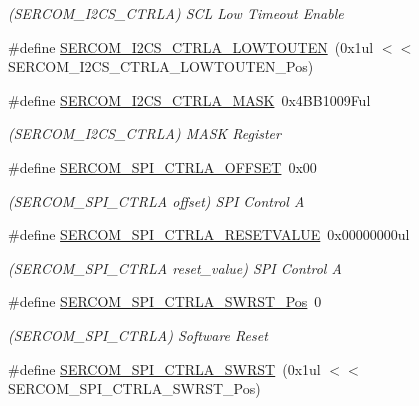 \begin{DoxyCompactItemize}
\begin{DoxyCompactList}\small\item\em (S\+E\+R\+C\+O\+M\+\_\+\+I2\+C\+S\+\_\+\+C\+T\+R\+LA) S\+CL Low Timeout Enable \end{DoxyCompactList}\item 
\#define \mbox{\hyperlink{group___s_a_m_d21___s_e_r_c_o_m_ga2530ee9d6d9364c37db47f66cf0dc193}{S\+E\+R\+C\+O\+M\+\_\+\+I2\+C\+S\+\_\+\+C\+T\+R\+L\+A\+\_\+\+L\+O\+W\+T\+O\+U\+T\+EN}}~(0x1ul $<$$<$ S\+E\+R\+C\+O\+M\+\_\+\+I2\+C\+S\+\_\+\+C\+T\+R\+L\+A\+\_\+\+L\+O\+W\+T\+O\+U\+T\+E\+N\+\_\+\+Pos)
\item 
\#define \mbox{\hyperlink{group___s_a_m_d21___s_e_r_c_o_m_gab8ffa0fe78ed6da3f431811f007f3504}{S\+E\+R\+C\+O\+M\+\_\+\+I2\+C\+S\+\_\+\+C\+T\+R\+L\+A\+\_\+\+M\+A\+SK}}~0x4\+B\+B1009\+Ful
\begin{DoxyCompactList}\small\item\em (S\+E\+R\+C\+O\+M\+\_\+\+I2\+C\+S\+\_\+\+C\+T\+R\+LA) M\+A\+SK Register \end{DoxyCompactList}\item 
\#define \mbox{\hyperlink{group___s_a_m_d21___s_e_r_c_o_m_ga72986752fedd413e6f842101677e7f52}{S\+E\+R\+C\+O\+M\+\_\+\+S\+P\+I\+\_\+\+C\+T\+R\+L\+A\+\_\+\+O\+F\+F\+S\+ET}}~0x00
\begin{DoxyCompactList}\small\item\em (S\+E\+R\+C\+O\+M\+\_\+\+S\+P\+I\+\_\+\+C\+T\+R\+LA offset) S\+PI Control A \end{DoxyCompactList}\item 
\#define \mbox{\hyperlink{group___s_a_m_d21___s_e_r_c_o_m_ga052a5b91f3d8c03c1814502c051d4c3f}{S\+E\+R\+C\+O\+M\+\_\+\+S\+P\+I\+\_\+\+C\+T\+R\+L\+A\+\_\+\+R\+E\+S\+E\+T\+V\+A\+L\+UE}}~0x00000000ul
\begin{DoxyCompactList}\small\item\em (S\+E\+R\+C\+O\+M\+\_\+\+S\+P\+I\+\_\+\+C\+T\+R\+LA reset\+\_\+value) S\+PI Control A \end{DoxyCompactList}\item 
\#define \mbox{\hyperlink{group___s_a_m_d21___s_e_r_c_o_m_ga2f3b0e958c4be7c848b3934c5648de5b}{S\+E\+R\+C\+O\+M\+\_\+\+S\+P\+I\+\_\+\+C\+T\+R\+L\+A\+\_\+\+S\+W\+R\+S\+T\+\_\+\+Pos}}~0
\begin{DoxyCompactList}\small\item\em (S\+E\+R\+C\+O\+M\+\_\+\+S\+P\+I\+\_\+\+C\+T\+R\+LA) Software Reset \end{DoxyCompactList}\item 
\#define \mbox{\hyperlink{group___s_a_m_d21___s_e_r_c_o_m_ga7b836f3dfb5363b970242ae5f00282fc}{S\+E\+R\+C\+O\+M\+\_\+\+S\+P\+I\+\_\+\+C\+T\+R\+L\+A\+\_\+\+S\+W\+R\+ST}}~(0x1ul $<$$<$ S\+E\+R\+C\+O\+M\+\_\+\+S\+P\+I\+\_\+\+C\+T\+R\+L\+A\+\_\+\+S\+W\+R\+S\+T\+\_\+\+Pos)

\end{DoxyCompactItemize}
